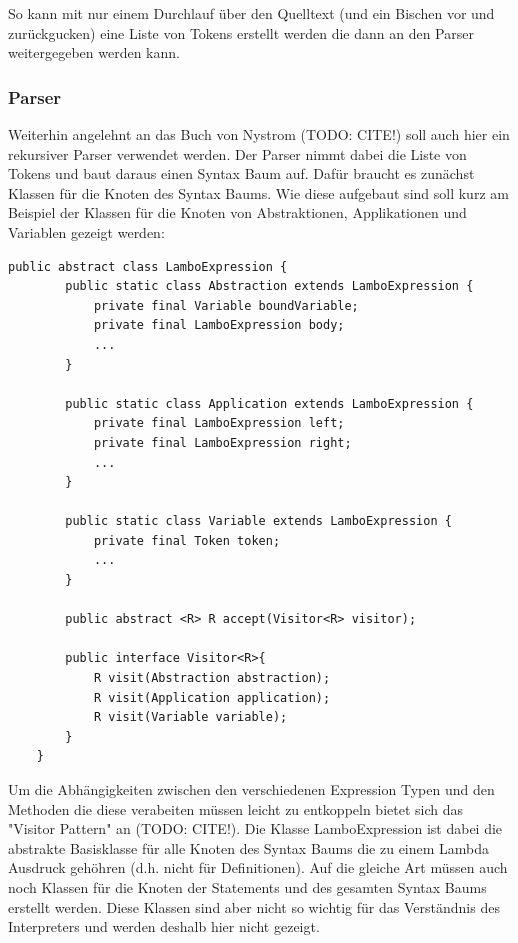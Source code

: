 \documentclass[ngerman]{article}
\begin{document}
So kann mit nur einem Durchlauf über den Quelltext (und ein Bischen vor und zurückgucken) eine Liste von Tokens erstellt werden die dann an den Parser weitergegeben werden kann.

\subsubsection{Parser}

Weiterhin angelehnt an das Buch von Nystrom (TODO: CITE!) soll auch hier ein rekursiver Parser verwendet werden. Der Parser nimmt dabei die Liste von Tokens und baut daraus einen Syntax Baum auf. Dafür braucht es zunächst Klassen für die Knoten des Syntax Baums. Wie diese aufgebaut sind soll kurz am Beispiel der Klassen für die Knoten von Abstraktionen, Applikationen und Variablen gezeigt werden:
\begin{lstlisting}[caption={TODO: Referenz zu Anhang}, captionpos=b]
    public abstract class LamboExpression {
        public static class Abstraction extends LamboExpression {
            private final Variable boundVariable;
            private final LamboExpression body;
            ...
        }
    
        public static class Application extends LamboExpression {
            private final LamboExpression left;
            private final LamboExpression right;
            ...
        }
    
        public static class Variable extends LamboExpression {
            private final Token token;
            ...
        }
    
        public abstract <R> R accept(Visitor<R> visitor);
    
        public interface Visitor<R>{
            R visit(Abstraction abstraction);
            R visit(Application application);
            R visit(Variable variable);
        }
    }
\end{lstlisting}
Um die Abhängigkeiten zwischen den verschiedenen Expression Typen und den Methoden die diese verabeiten müssen leicht zu entkoppeln bietet sich das "Visitor Pattern" an (TODO: CITE!). Die Klasse LamboExpression ist dabei die abstrakte Basisklasse für alle Knoten des Syntax Baums die zu einem Lambda Ausdruck gehöhren (d.h. nicht für Definitionen). Auf die gleiche Art müssen auch noch Klassen für die Knoten der Statements und des gesamten Syntax Baums erstellt werden. Diese Klassen sind aber nicht so wichtig für das Verständnis des Interpreters und werden deshalb hier nicht gezeigt.
\end{document}
